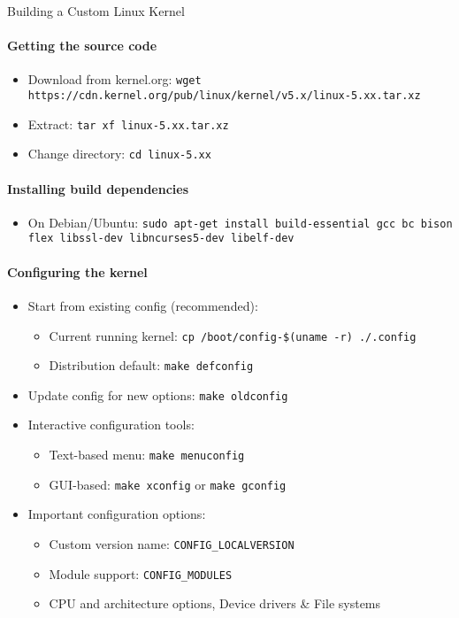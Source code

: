 \begin{KR}{Building a Custom Linux Kernel}
    \paragraph{Getting the source code}
    \begin{itemize}
        \item Download from kernel.org: \texttt{wget https://cdn.kernel.org/pub/linux/kernel/v5.x/linux-5.xx.tar.xz}
        \item Extract: \texttt{tar xf linux-5.xx.tar.xz}
        \item Change directory: \texttt{cd linux-5.xx}
    \end{itemize}
    
    \paragraph{Installing build dependencies}
    \begin{itemize}
        \item On Debian/Ubuntu: \texttt{sudo apt-get install build-essential gcc bc bison flex libssl-dev libncurses5-dev libelf-dev}
    \end{itemize}
    
    \paragraph{Configuring the kernel}
    \begin{itemize}
        \item Start from existing config (recommended):
            \begin{itemize}
                \item Current running kernel: \texttt{cp /boot/config-\$(uname -r) ./.config}
                \item Distribution default: \texttt{make defconfig}
            \end{itemize}
        \item Update config for new options: \texttt{make oldconfig}
        \item Interactive configuration tools:
            \begin{itemize}
                \item Text-based menu: \texttt{make menuconfig}
                \item GUI-based: \texttt{make xconfig} or \texttt{make gconfig}
            \end{itemize}
        \item Important configuration options:
            \begin{itemize}
                \item Custom version name: \texttt{CONFIG\_LOCALVERSION}
                \item Module support: \texttt{CONFIG\_MODULES}
                \item CPU and architecture options, Device drivers \& File systems
            \end{itemize}
    \end{itemize}
    

\end{KR}
